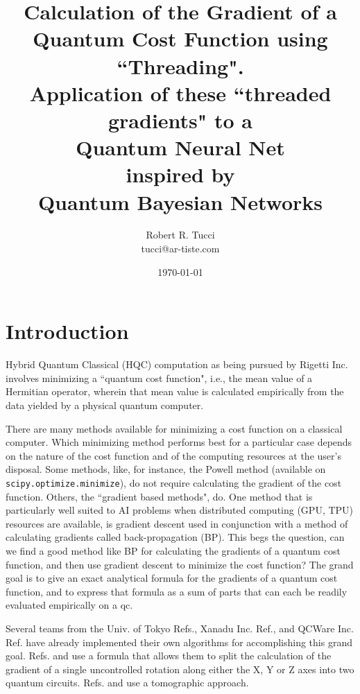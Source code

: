 \documentclass[12pt]{article}
\begin{document}
\title{Calculation of the Gradient of a
Quantum Cost Function
 using
``Threading". \\Application of these ``threaded gradients"
 to a \\Quantum Neural Net\\ inspired by\\
 Quantum Bayesian Networks }


\author{Robert R. Tucci\\
        tucci@ar-tiste.com}


\date{\today}
\maketitle
\vskip2cm

\section{Introduction}

Hybrid Quantum Classical (HQC) computation
as being pursued by Rigetti Inc. involves
minimizing a ``quantum cost function", i.e.,
the mean value of a Hermitian operator,
wherein that mean value is calculated empirically from
the data yielded by a physical quantum computer.

There are many methods available for minimizing
a cost function on a classical computer.
Which minimizing method performs
best for a particular case depends on the nature of
the cost function and of the
computing resources at the user's disposal.
Some methods, like, for instance,
the  Powell method (available on
{\tt scipy.optimize.minimize}),
do not require
calculating
the gradient of the cost function.
Others, the ``gradient based methods", do.
One method that is particularly well
suited to AI problems when
distributed computing (GPU, TPU)
resources are available, is
gradient descent
used in conjunction with
a method of calculating gradients
called back-propagation (BP).
This begs the question,
can we find a good
method like BP for calculating
the gradients of a quantum cost function,
and then use gradient descent to
minimize the cost function?
The grand goal is to
give an exact analytical
formula for the gradients of a quantum cost function,
and to
express that formula as a sum of parts that
can each be readily evaluated empirically on a qc.

Several teams from the Univ. of Tokyo
Refs.\cite{japan}\cite{japan2},
Xanadu Inc. Ref.\cite{xanadu}, and QCWare Inc.
Ref.\cite{qcware}
have already
implemented their own algorithms for
accomplishing this grand goal.
Refs. \cite{japan} and \cite{xanadu}
use a formula that allows them to split
the calculation of the gradient
of a single uncontrolled rotation
along either the X, Y or Z axes into two
quantum circuits. Refs.\cite{japan2}
and \cite{qcware} use a tomographic approach.
\end{document}
